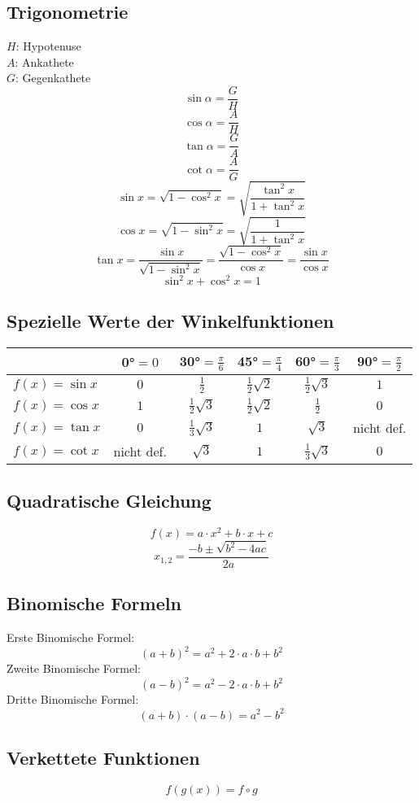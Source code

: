 \subsection{Trigonometrie}
$H$: Hypotenuse\\
$A$: Ankathete\\
$G$: Gegenkathete
\[ \boxed{\sin\alpha=\frac{G}{H}} \]
\[ \boxed{\cos\alpha=\frac{A}{H}} \]
\[ \boxed{\tan\alpha=\frac{G}{A}} \]
\[ \boxed{\cot\alpha=\frac{A}{G}} \]
\[ \boxed{\sin x = \sqrt{1-\cos^2x} = \sqrt{\frac{\tan^2x}{1+\tan^2x}}} \]
\[ \boxed{\cos x = \sqrt{1-\sin^2x} = \sqrt{\frac{1}{1+\tan^2x}}} \]
\[ \boxed{\tan x = \frac{\sin x}{\sqrt{1-\sin^2x}} = \frac{\sqrt{1-\cos^2x}}{\cos x} = \frac{\sin x}{\cos x}} \]
\[ \boxed{\sin^2 x + \cos^2 x = 1} \]

\subsection{Spezielle Werte der Winkelfunktionen}
\begin{tabular}{|l|c|c|c|c|c|}
\hline              & 0°$ = 0$ & 30°$ = \frac{\pi}{6}$ & 45°$ = \frac{\pi}{4}$ & 60°$ = \frac{\pi}{3}$ & 90°$ = \frac{\pi}{2}$ \\
\hline $f\left(x\right)=\sin x$ & $0$ & $\frac{1}{2}$ & $\frac{1}{2}\sqrt{2}$ & $\frac{1}{2}\sqrt{3}$ & $1$ \\
\hline $f\left(x\right)=\cos x$ & $1$ & $\frac{1}{2}\sqrt{3}$ & $\frac{1}{2}\sqrt{2}$ & $\frac{1}{2}$ & $0$ \\
\hline $f\left(x\right)=\tan x$ & $0$ & $\frac{1}{3}\sqrt{3}$ & $1$ & $\sqrt{3}$ & nicht def. \\
\hline $f\left(x\right)=\cot x$ & nicht def. & $\sqrt{3}$ & $1$ & $\frac{1}{3}\sqrt{3}$ & $0$ \\
\hline \end{tabular}

\subsection{Quadratische Gleichung}
\[ \boxed{f(x) = a \cdot x^2 + b \cdot x + c} \]
\[ \boxed{x_{1,2}=\frac{-b\pm\sqrt{b^2-4ac}}{2a}} \]

\subsection{Binomische Formeln}
Erste Binomische Formel: 
\[ \boxed{(a + b)^2 = a^2 + 2 \cdot a \cdot b + b^2} \]Zweite Binomische Formel: 
\[ \boxed{(a - b)^2 = a^2 - 2 \cdot a \cdot b + b^2} \]Dritte Binomische Formel: 
\[ \boxed{(a + b) \cdot (a - b) = a^2 - b^2} \]

\subsection{Verkettete Funktionen}
\[ \boxed{f(g(x)) = f \circ g} \]
